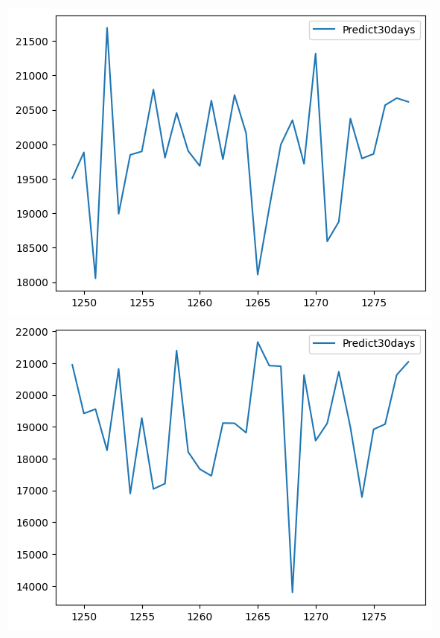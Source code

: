 \begin{figure}[H]
\begin{minipage}{0.15\textwidth}
    \includegraphics[width=1\textwidth]{resources/chapter-5/predicted/EXB_ML_7_3_next30days.png}
    \end{minipage}
    \hfill
    \begin{minipage}{0.15\textwidth}
    \centering
    \includegraphics[width=1\textwidth]{resources/chapter-5/predicted/EXB_ML_8_2_next30days.png}
    \end{minipage}
    \hfill
        \begin{minipage}{0.15\textwidth}
    \centering

\end{minipage}
\end{figure}
